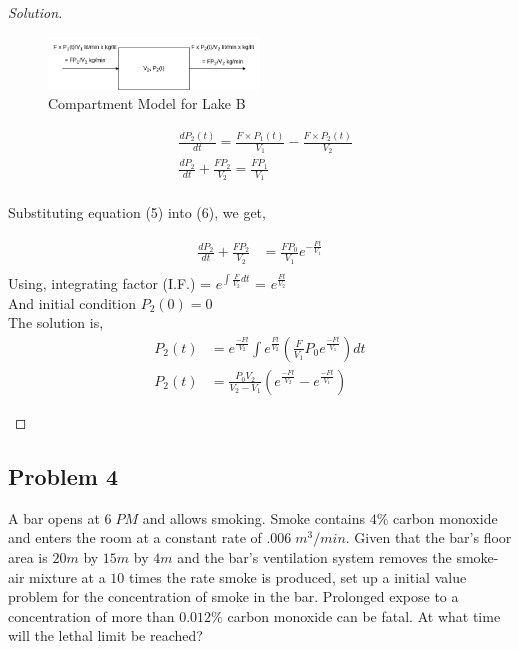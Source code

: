 \documentclass{article}
\newenvironment{solution}
{\renewcommand\qedsymbol{$\blacksquare$}\begin{proof}[Solution]}{\end{proof}}
\begin{document}
\begin{solution}
\begin{multicols}{2}
\columnbreak

\begin{figure}[H]
\caption{Compartment Model for Lake B}
\centering
\includegraphics[width=0.5\textwidth]{"Problem3 - Right Compartment"}
\end{figure}

\begin{equation}
\begin{split}
&\frac{dP_2(t)}{dt} = \frac{F \times P_1(t)}{V_1} - \frac{F \times P_2(t)}{V_2}\\
&\frac{dP_2}{dt} + \frac{FP_2}{V_2} = \frac{FP_1}{V_1}\\
\end{split}
\end{equation}

Substituting equation (5) into (6), we get,

\begin{equation}
\begin{split}
\frac{dP_2}{dt} + \frac{FP_2}{V_2} &= \frac{FP_0}{V_1}e^{-\frac{Ft}{V_1}}\\
\end{split}
\end{equation}
Using, integrating factor (I.F.) = $e^{\int{\frac{F}{V_2}dt}}$ = $e^{\frac{Ft}{V_2}}$\\
And initial condition $P_2(0) = 0$\\
The solution is,
\begin{equation}
\begin{split}
P_2(t) &= e^{\frac{-Ft}{V_2}}\int{e^{\frac{Ft}{V_2}}\left(\frac{F}{V_1}P_0e^{\frac{-Ft}{V_1}}\right)}dt\\
P_2(t) &= \frac{P_0V_2}{V_2-V_1}\left(e^{\frac{-Ft}{V_2}} - e^{\frac{-Ft}{V_1}}\right)
\end{split}
\end{equation}


\end{multicols}


\end{solution}


\subsection*{Problem 4}
A bar opens at $6 \; PM$ and allows smoking. Smoke contains $4\%$ carbon monoxide and enters the
room at a constant rate of $.006 \; m^3/min$. Given that the bar's floor area is $20 m$ by $15 m$ by $4
m$ and the bar's ventilation system removes the smoke-air mixture at a $10$ times the rate smoke is
produced, set up a initial value problem for the concentration of smoke in the bar.
Prolonged expose to a concentration of more than $0.012\%$ carbon monoxide can be fatal. At
what time will the lethal limit be reached?
\end{document}
